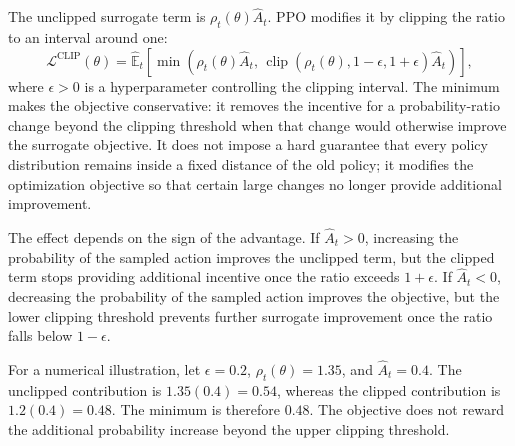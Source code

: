 The unclipped surrogate term is
\(\rho_t(\theta)\widehat{A}_t\). PPO modifies it by clipping the ratio to
an interval around one:
\begin{equation}
    \mathcal{L}^{\mathrm{CLIP}}(\theta)
    =
    \widehat{\mathbb{E}}_t
    \left[
        \min
        \left(
            \rho_t(\theta)\widehat{A}_t,\,
            \operatorname{clip}
            \left(
                \rho_t(\theta),1-\epsilon,1+\epsilon
            \right)\widehat{A}_t
        \right)
    \right],
    \label{eq:ac-ppo-clipped-objective}
\end{equation}
where \(\epsilon>0\) is a hyperparameter controlling the clipping interval.
The minimum makes the objective conservative: it removes the incentive
for a probability-ratio change beyond the clipping threshold when that
change would otherwise improve the surrogate objective. It does not impose
a hard guarantee that every policy distribution remains inside a fixed
distance of the old policy; it modifies the optimization objective so that
certain large changes no longer provide additional improvement.

The effect depends on the sign of the advantage. If
\(\widehat{A}_t>0\), increasing the probability of the sampled action
improves the unclipped term, but the clipped term stops providing additional
incentive once the ratio exceeds \(1+\epsilon\). If
\(\widehat{A}_t<0\), decreasing the probability of the sampled action
improves the objective, but the lower clipping threshold prevents further
surrogate improvement once the ratio falls below \(1-\epsilon\).

For a numerical illustration, let \(\epsilon=0.2\),
\(\rho_t(\theta)=1.35\), and \(\widehat{A}_t=0.4\). The unclipped
contribution is \(1.35(0.4)=0.54\), whereas the clipped contribution is
\(1.2(0.4)=0.48\). The minimum is therefore \(0.48\). The objective does
not reward the additional probability increase beyond the upper clipping
threshold.

